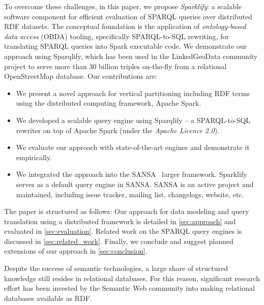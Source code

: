 To overcome these challenges, in this paper, we propose \emph{Sparklify}: a scalable software component for efficient evaluation of SPARQL queries over distributed RDF datasets. The conceptual foundation is the application of \emph{ontology-based data access} (OBDA) tooling, specifically SPARQL-to-SQL rewriting, for translating SPARQL queries into Spark executable code. We demonstrate our approach using Sparqlify, which has been used in the LinkedGeoData community project to serve more than 30 billion triples on-the-fly from a relational OpenStreetMap database.
Our contributions are:
\begin{itemize}
 \item We present a novel approach for vertical partitioning including RDF terms using the distributed computing framework, Apache Spark.
 \item We developed a scalable query engine using Sparqlify -- a SPARQL-to-SQL rewriter on top of Apache Spark (under the \textit{Apache Licence 2.0}).
 \item We evaluate our approach with state-of-the-art engines and demonstrate it empirically.
 \item We integrated the approach into the SANSA~\cite{lehmann-2017-sansa-iswc} larger framework.
 Sparklify serves as a default query engine in SANSA.
 SANSA is an active project and maintained, including issue tracker, mailing list, changelogs, website, etc.
\end{itemize}

The paper is structured as follows:
Our approach for data modeling and query translation using a distributed framework is detailed in \autoref{sec:approach} and evaluated in \autoref{sec:evaluation}.
Related work on the SPARQL query engines is discussed in \autoref{sec:related_work}.
Finally, we conclude and suggest planned extensions of our approach in \autoref{sec:conclusion}.



Despite the success of semantic technologies, a large share of structured knowledge still resides in relational databases.
For this reason, significant research effort has been invested by the Semantic Web community into making relational databases available as RDF.

